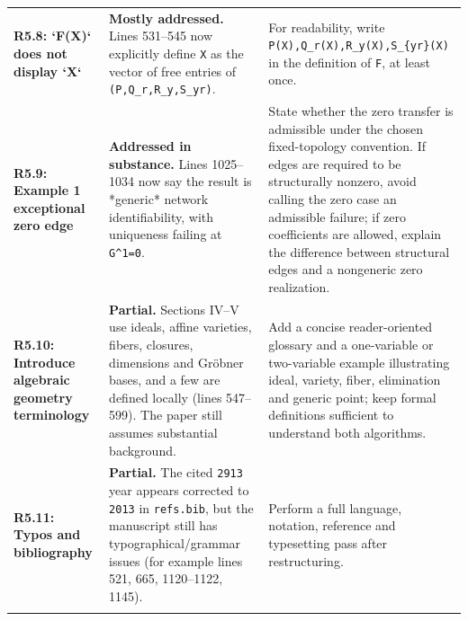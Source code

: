 \documentclass[11pt,a4paper]{article}
\begin{document}
\begin{longtable}{@{}p{}p{}p{}@{}}
\textbf{R5.8: `F(X)` does not display `X`} & \textbf{Mostly addressed.} Lines 531–545 now explicitly define \texttt{X} as the vector of free entries of \texttt{(P,Q\_r,R\_y,S\_yr)}. & For readability, write \texttt{P(X),Q\_r(X),R\_y(X),S\_\{yr\}(X)} in the definition of \texttt{F}, at least once.\\\addlinespace\midrule
\textbf{R5.9: Example 1 exceptional zero edge} & \textbf{Addressed in substance.} Lines 1025–1034 now say the result is *generic* network identifiability, with uniqueness failing at \texttt{G\textasciicircum{}1=0}. & State whether the zero transfer is admissible under the chosen fixed-topology convention. If edges are required to be structurally nonzero, avoid calling the zero case an admissible failure; if zero coefficients are allowed, explain the difference between structural edges and a nongeneric zero realization.\\\addlinespace\midrule
\textbf{R5.10: Introduce algebraic geometry terminology} & \textbf{Partial.} Sections IV–V use ideals, affine varieties, fibers, closures, dimensions and Gröbner bases, and a few are defined locally (lines 547–599). The paper still assumes substantial background. & Add a concise reader-oriented glossary and a one-variable or two-variable example illustrating ideal, variety, fiber, elimination and generic point; keep formal definitions sufficient to understand both algorithms.\\\addlinespace\midrule
\textbf{R5.11: Typos and bibliography} & \textbf{Partial.} The cited \texttt{2913} year appears corrected to \texttt{2013} in \texttt{refs.bib}, but the manuscript still has typographical/grammar issues (for example lines 521, 665, 1120–1122, 1145). & Perform a full language, notation, reference and typesetting pass after restructuring.\\\addlinespace\midrule
\bottomrule
\end{longtable}
\normalsize
\end{document}
